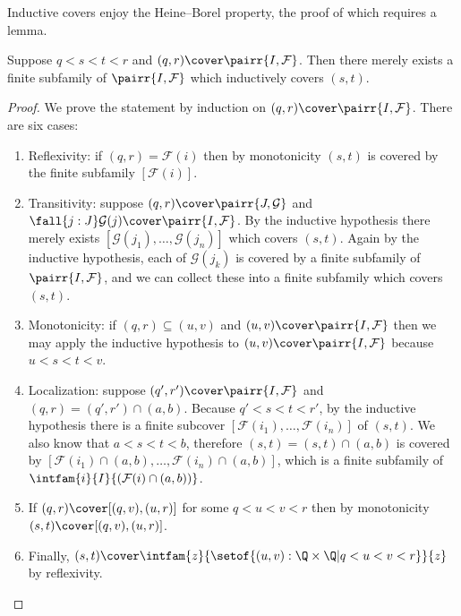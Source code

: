 Inductive covers enjoy the Heine--Borel property, the proof of which requires a lemma.

\begin{lem} \label{reals-formal-topology-locally-compact}
  Suppose $q < s < t < r$ and $(q, r) \cover \pairr{I, \mathcal{F}}$. Then there merely
  exists a finite subfamily of $\pairr{I, \mathcal{F}}$ which inductively covers $(s, t)$.
\end{lem}

\begin{proof}
  We prove the statement by induction on $(q, r) \cover \pairr{I, \mathcal{F}}$. There are
  six cases:
  \begin{enumerate}

  \item Reflexivity: if $(q, r) = \mathcal{F}(i)$ then by monotonicity $(s, t)$ is covered
    by the finite subfamily $[\mathcal{F}(i)]$.

  \item Transitivity:
    suppose $(q, r) \cover \pairr{J, \mathcal{G}}$ and $\fall{j : J} \mathcal{G}(j) \cover
    \pairr{I, \mathcal{F}}$. By the inductive hypothesis there merely exists
    $[\mathcal{G}(j_1), \ldots, \mathcal{G}(j_n)]$ which covers $(s, t)$.
    Again by the inductive hypothesis, each of $\mathcal{G}(j_k)$ is covered by a finite
    subfamily of $\pairr{I, \mathcal{F}}$, and we can collect these into a finite
    subfamily which covers $(s, t)$.

  \item Monotonicity:
    if $(q, r) \subseteq (u, v)$ and $(u, v) \cover \pairr{I, \mathcal{F}}$ then we may
    apply the inductive hypothesis to $(u, v) \cover \pairr{I, \mathcal{F}}$ because $u <
    s < t < v$.

  \item Localization:
    suppose $(q', r') \cover \pairr{I, \mathcal{F}}$ and $(q, r) = (q', r') \cap (a, b)$.
    Because $q' < s < t < r'$, by the inductive hypothesis there is a finite subcover
    $[\mathcal{F}(i_1), \ldots, \mathcal{F}(i_n)]$ of $(s, t)$. We also know that $a < s <
    t < b$, therefore $(s, t) = (s, t) \cap (a, b)$ is covered by
    $[\mathcal{F}(i_1) \cap (a,b), \ldots, \mathcal{F}(i_n) \cap (a,b)]$, which is a
    finite subfamily of $\intfam{i}{I}{(\mathcal{F}(i) \cap (a, b))}$.

  \item If $(q, r) \cover [(q, v), (u, r)]$ for some $q < u < v < r$ then by monotonicity
    $(s, t) \cover [(q, v), (u, r)]$.

  \item Finally, $(s, t) \cover \intfam{z}{\setof{ (u,v):\Q \times \Q | q < u < v < r}}{z}$ by
    reflexivity. \qedhere
  \end{enumerate}
\end{proof}

